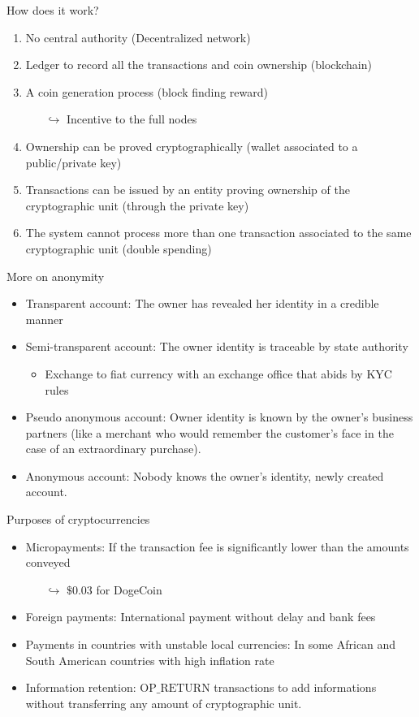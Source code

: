 \documentclass{beamer}
\begin{document}
\begin{frame}{How does it work?}
\begin{enumerate}
  \item No central authority (Decentralized network)
  \item Ledger to record all the transactions and coin ownership (blockchain)
  \item A coin generation process (block finding reward)
    \begin{itemize}
    \item[$\hookrightarrow$] Incentive to the full nodes 
  \end{itemize}
  \item Ownership can be proved cryptographically (wallet associated to a public/private key)
  \item Transactions can be issued by an entity proving ownership of the cryptographic unit (through the private key) 
  \item The system cannot process more than one transaction associated to the same cryptographic unit (double spending)
\end{enumerate}
\end{frame}
\begin{frame}{More on anonymity}
\begin{itemize}
  \item Transparent account: The owner has revealed her identity in a credible manner
  \item Semi-transparent account: The owner identity is traceable by state authority
  \begin{itemize}
    \item Exchange to fiat currency with an exchange office that abids by KYC rules
  \end{itemize}
  \item Pseudo anonymous account: Owner identity is known by the owner's business partners (like a merchant who would remember the customer's face in the case of an extraordinary purchase).
  \item Anonymous account: Nobody knows the owner's identity, newly created account.
\end{itemize}
\end{frame}
\begin{frame}{Purposes of cryptocurrencies}
\begin{itemize}
  \item Micropayments: If the transaction fee is significantly lower than the amounts conveyed
      \begin{itemize}
    \item[$\hookrightarrow$] $\$0.03$ for DogeCoin  
  \end{itemize}
  \item Foreign payments: International payment without delay and bank fees
  \item Payments in countries with unstable local currencies: In some African and South American countries with high inflation rate
  \item Information retention: $\text{OP}\_\text{RETURN}$ transactions to add informations without transferring any amount of cryptographic unit. 
\end{itemize}
\end{frame}
\end{document}
